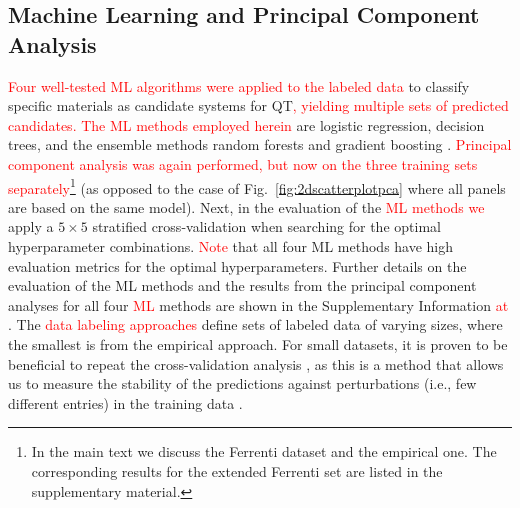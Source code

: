 \documentclass[superscriptaddress,unsortedaddress,
 amsmath,amssymb,
 aps,
]{revtex4-2}
\newcommand{\mrk}[1]{\textcolor{red}{#1}}
\begin{document}

\subsection*{Machine Learning and Principal Component Analysis}
\mrk{Four well-tested ML algorithms were applied to the labeled data} to classify specific materials as candidate systems for QT\mrk{, yielding multiple sets of predicted candidates. The ML methods employed herein} are logistic regression, decision trees, and the ensemble methods random forests and gradient boosting \cite{Mehta2019,Hastie2009,Murphy2012}. 
\mrk{Principal component analysis was again performed, but now on the three training sets separately}\footnote{In the main text we discuss the Ferrenti dataset and the empirical one. The corresponding results for the extended Ferrenti set are listed in the supplementary material.}
(as opposed to the case of Fig.~\ref{fig:2dscatterplotpca} where all panels are based on the same model). 
Next, in the evaluation of the \mrk{ML methods we}  
apply a $5\times 5$ stratified cross-validation \cite{Hastie2009} when searching for the optimal hyperparameter combinations. \mrk{Note} that all four ML methods have high evaluation metrics for the optimal hyperparameters. Further details on the evaluation of the ML methods and the results from the principal component analyses for all four \mrk{ML} methods are shown in the Supplementary Information \mrk{at} \cite{supplementary}.  
The \mrk{data labeling approaches} define sets of labeled data of varying sizes, where the smallest is from the empirical approach. For small datasets, it is proven to be beneficial to repeat the cross-validation analysis \cite{Hastie2009}, as this is a method that allows us to measure the stability of the predictions against perturbations (i.e., few different entries) in the training data \cite{Beleites2008}.
\end{document}
